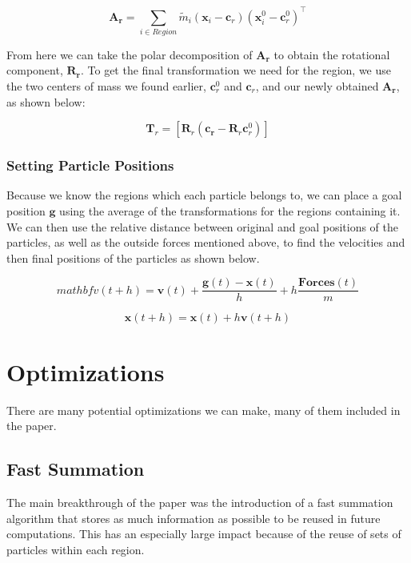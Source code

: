 \documentclass[12pt,a4paper]{amsart}
\begin{document}
	\[ \mathbf{A_r} = \sum_{i \in Region} \tilde{m}_i ( \mathbf{x}_i - \mathbf{c}_r ) ( \mathbf{x}_i^0 - \mathbf{c}_r^0 )^\top \]
	
	From here we can take the polar decomposition of $\mathbf{A_r}$ to obtain the rotational component, $\mathbf{R_{r}}$. To get the final transformation we need for the region, we use the two centers of mass we found earlier, $\mathbf{c}_r^0$ and $\mathbf{c}_r$, and our newly obtained $\mathbf{A_r}$, as shown below:
	
	\[ \mathbf{T}_r = [\mathbf{R}_r (\mathbf{c_r} - \mathbf{R}_r \mathbf{c}_r^0) ] \]
	
	\subsubsection{Setting Particle Positions}
	
	Because we know the regions which each particle belongs to, we can place a goal position $\mathbf{g}$ using the average of the transformations for the regions containing it. We can then use the relative distance between original and goal positions of the particles, as well as the outside forces mentioned above, to find the velocities and then final positions of the particles as shown below.
	
	\[ mathbf{v}(t+h) = \mathbf{v}(t) + \frac{\mathbf{g}(t) - \mathbf{x}(t)}{h} + h \frac{\mathbf{Forces}(t)}{m} \]
	
	\[ \mathbf{x}(t+h) = \mathbf{x}(t) + h \mathbf{v}(t + h) \]
	
	\section{Optimizations}
	There are many potential optimizations we can make, many of them included in the \cite{rivers} paper.
	
	\subsection{Fast Summation}
	The main breakthrough of the paper was the introduction of a fast summation algorithm that stores as much information as possible to be reused in future computations. This has an especially large impact because of the reuse of sets of particles within each region.
	
	
	
	
\end{document}
